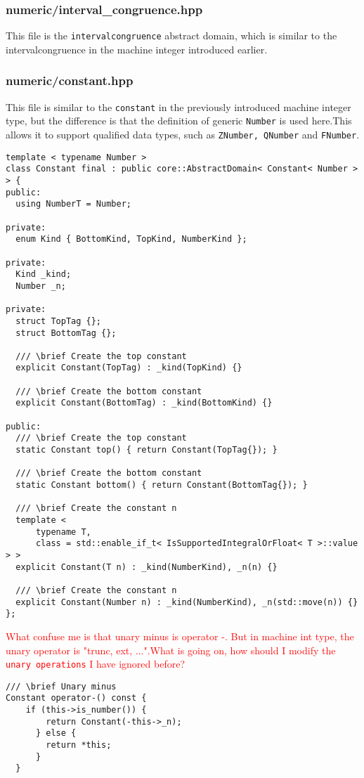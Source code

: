 \documentclass[12pt]{article}
\begin{document}
\subsubsection{numeric/interval\_congruence.hpp}
This file is the \texttt{intervalcongruence} abstract domain, which is similar to the intervalcongruence in the machine integer introduced earlier.

\subsubsection{numeric/constant.hpp}
This file is similar to the \texttt{constant} in the previously introduced machine integer type, but the difference is that the definition of generic \texttt{Number} is used here.This allows it to support qualified data types, such as \texttt{ZNumber, QNumber} and \texttt{FNumber}.
\begin{lstlisting}
template < typename Number >
class Constant final : public core::AbstractDomain< Constant< Number > > {
public:
  using NumberT = Number;

private:
  enum Kind { BottomKind, TopKind, NumberKind };

private:
  Kind _kind;
  Number _n;

private:
  struct TopTag {};
  struct BottomTag {};

  /// \brief Create the top constant
  explicit Constant(TopTag) : _kind(TopKind) {}

  /// \brief Create the bottom constant
  explicit Constant(BottomTag) : _kind(BottomKind) {}

public:
  /// \brief Create the top constant
  static Constant top() { return Constant(TopTag{}); }

  /// \brief Create the bottom constant
  static Constant bottom() { return Constant(BottomTag{}); }

  /// \brief Create the constant n
  template <
      typename T,
      class = std::enable_if_t< IsSupportedIntegralOrFloat< T >::value > >
  explicit Constant(T n) : _kind(NumberKind), _n(n) {}

  /// \brief Create the constant n
  explicit Constant(Number n) : _kind(NumberKind), _n(std::move(n)) {}
};
\end{lstlisting}

\textcolor{red}{What confuse me is that unary minus is operator -. But in machine int type, the unary operator is "trunc, ext, ...".What is going on, how should I modify the \texttt{unary operations} I have ignored before?}
\begin{lstlisting}
/// \brief Unary minus
Constant operator-() const {
    if (this->is_number()) {
        return Constant(-this->_n);
      } else {
        return *this;
      }
  }
\end{lstlisting}
\end{document}
